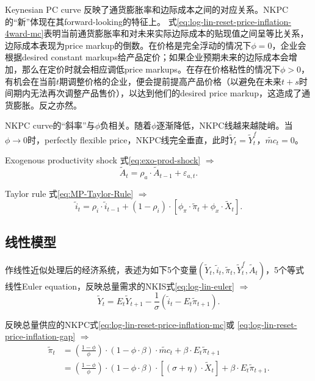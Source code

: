Keynesian PC curve 反映了通货膨胀率和边际成本之间的对应关系。NKPC的“新”体现在其forward-looking的特征上。  式\eqref{eq:log-lin-reset-price-inflation-4ward-mc}表明当前通货膨胀率和对未来实际边际成本的贴现值之间呈等比关系，边际成本表现为price markup的倒数。在价格是完全浮动的情况下$\phi = 0$，企业会根据desired constant markups给产品定价；如果企业预期未来的边际成本会增加，那么在定价时就会相应调低price markups。在存在价格粘性的情况下$\phi >0$，有机会在当前$t$期调整价格的企业，便会提前提高产品价格（以避免在未来$t+s$时间期内无法再次调整产品售价），以达到他们的desired price markup，这造成了通货膨胀。反之亦然。

NKPC curve的“斜率”与$\phi$负相关。随着$\phi$逐渐降低，NKPC线越来越陡峭。当$\phi \rightarrow 0$时，perfectly flexible price，NKPC线完全垂直，此时$\tilde{Y}_t = \tilde{Y}_t^f$，$\tilde{mc}_t = 0$。

Exogenous productivity shock 式\eqref{eq:exo-prod-shock} $\Rightarrow$
\begin{equation}
  \label{eq:log-lin-prod-shock}
  \tilde{A}_t =\rho_a \cdot \tilde{A}_{t-1} + \varepsilon_{a,t}.
\end{equation}

Taylor rule 式\eqref{eq:MP-Taylor-Rule} $\Rightarrow$
\begin{equation}
  \label{eq:log-lin-tayl-rule}
  \tilde{i}_t = \rho_i \cdot \tilde{i}_{t-1} + (1-\rho_i) \cdot \left[\phi_{\pi} \cdot \tilde{\pi}_t + \phi_{x} \cdot \tilde{X}_t \right].
\end{equation}

\subsection{线性模型}
\label{sec:BNK-log-linearization-system}
作线性近似处理后的经济系统，表述为如下5个变量$\left(\tilde{Y}_t, \tilde{i}_t, \tilde{\pi}_t, \tilde{Y}_t^f, \tilde{A}_t\right)$，5个等式
线性Euler equation，反映总量需求的NKIS式\eqref{eq:log-lin-euler} $\Rightarrow$
\begin{equation*}
  \tilde{Y}_t = E_t \tilde{Y}_{t+1} - \frac{1}{\sigma} \left(\tilde{i}_t - E_t \tilde{\pi}_{t+1}\right).
\end{equation*}

反映总量供应的NKPC式\eqref{eq:log-lin-reset-price-inflation-mc}或  \eqref{eq:log-lin-reset-price-inflation-gap} $\Rightarrow$
\begin{align*}
  \tilde{\pi}_t &= \left(\frac{1-\phi}{\phi}\right) \cdot (1-\phi \cdot \beta) \cdot \tilde{mc}_{t} + \beta \cdot E_t \tilde{\pi}_{t+1}\\
                &=\left(\frac{1-\phi}{\phi}\right) \cdot (1-\phi \cdot \beta) \cdot \left[(\sigma + \eta) \cdot \tilde{X}_t \right] + \beta \cdot E_t \tilde{\pi}_{t+1}.
\end{align*}


